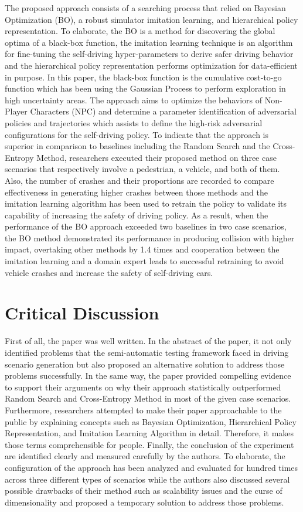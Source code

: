 \documentclass[10pt,a4paper]{report}
\begin{document}
The proposed approach consists of a searching process that relied on Bayesian Optimization (BO), a robust simulator imitation learning, and hierarchical policy representation.
%
To elaborate, the BO is a method for discovering the global optima of a black-box function, the imitation learning technique is an algorithm for fine-tuning the self-driving hyper-parameters to derive safer driving behavior and the hierarchical policy representation performs optimization for data-efficient in purpose.
%
In this paper, the black-box function is the cumulative cost-to-go function which has been using the Gaussian Process to perform exploration in high uncertainty areas.
%
The approach aims to optimize the behaviors of Non-Player Characters (NPC)
%
and determine a parameter identification of adversarial policies and trajectories which assists to define the high-risk adversarial configurations for the self-driving policy. 
% 
To indicate that the approach is superior in comparison to baselines including the Random Search and the Cross-Entropy Method, researchers executed their proposed method on three case scenarios that respectively involve a pedestrian, a vehicle, and both of them.
%
Also, the number of crashes and their proportions are recorded to compare effectiveness in generating higher crashes between those methods and
%
the imitation learning algorithm has been used to retrain the policy to validate its capability of increasing the safety of driving policy.
%
As a result, when the performance of the BO approach exceeded two baselines in two case scenarios, the BO method demonstrated its performance in producing collision with higher impact, overtaking other methods by 1.4 times and cooperation between the imitation learning and a domain expert leads to successful retraining to avoid vehicle crashes and increase the safety of self-driving cars.



\section{Critical Discussion}
First of all, the paper was well written. In the abstract of the paper, it not only identified problems that the semi-automatic testing framework faced in driving scenario generation but also proposed an alternative solution to address those problems successfully. 
%
In the same way, the paper provided compelling evidence to support their arguments on why their approach statistically outperformed Random Search and Cross-Entropy Method in most of the given case scenarios.
%
Furthermore, researchers attempted to make their paper approachable to the public by explaining concepts such as Bayesian Optimization, Hierarchical Policy Representation, and Imitation Learning Algorithm in detail.
%
Therefore, it makes those terms comprehensible for people.  
%
Finally, the conclusion of the experiment are identified clearly and measured carefully by the authors. 
%
To elaborate, the configuration of the approach has been analyzed and evaluated for hundred times across three different types of scenarios while the authors also discussed several possible drawbacks of their method such as scalability issues and the curse of dimensionality and proposed a temporary solution to address those problems.
%
\end{document}
